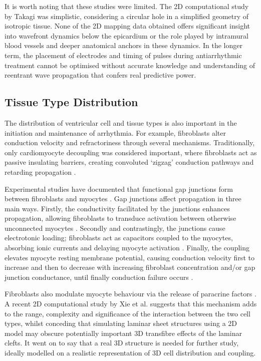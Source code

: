    It is worth noting that these studies were limited. The 2D computational study by Takagi \cite{Takagi2004} was simplistic, considering a circular hole in a simplified geometry of isotropic tissue. None of the 2D mapping data obtained offers significant insight into wavefront dynamics below the epicardium or the role played by intramural blood vessels and deeper anatomical anchors in these dynamics. In the longer term, the placement of electrodes and timing of pulses during antiarrhythmic treatment cannot be optimised without accurate knowledge and understanding of reentrant wave propagation that confers real predictive power.
    

  \subsection{Tissue Type Distribution} %
  \label{sub:tissue_type_distribution}
    The distribution of ventricular cell and tissue types is also important in the initiation and maintenance of arrhythmia. For example, fibroblasts alter conduction velocity and refractoriness through several mechanisms. Traditionally, only cardiomyocyte decoupling was considered important, where fibroblasts act as passive insulating barriers, creating convoluted ‘zigzag’ conduction pathways and retarding propagation \cite{DeBakker2006,Spach2007}.
  
    Experimental studies have documented that functional gap junctions form between fibroblasts and myocytes \cite{Camelliti2004, Camelliti2005, Walker2007}. Gap junctions affect propagation in three main ways.  Firstly, the conductivity facilitated by the junctions enhances propagation, allowing fibroblasts to transduce activation between otherwise unconnected myocytes \cite{Gaudesius2003, Zlochiver2008}. Secondly and contrastingly, the junctions cause electrotonic loading; fibroblasts act as capacitors coupled to the myocytes, absorbing ionic currents and delaying myocyte activation \cite{Jacquemet2007, Xie2009}. Finally, the coupling elevates myocyte resting membrane potential, causing conduction velocity first to increase and then to decrease with increasing fibroblast concentration and/or gap junction conductance, until finally conduction failure occurs \cite{Miragoli2006, Xie2009}.
  
    Fibroblasts also modulate myocyte behaviour via the release of paracrine factors \cite{Pedrotty2009}. A recent 2D computational study by Xie et al. \cite{Xie2009} suggests that this mechanism adds to the range, complexity and significance of the interaction between the two cell types, whilst conceding that simulating laminar sheet structures using a 2D model may obscure potentially important 3D transfibre effects of the laminar clefts. It went on to say that a real 3D structure is needed for further study, ideally modelled on a realistic representation of 3D cell distribution and coupling.
  
